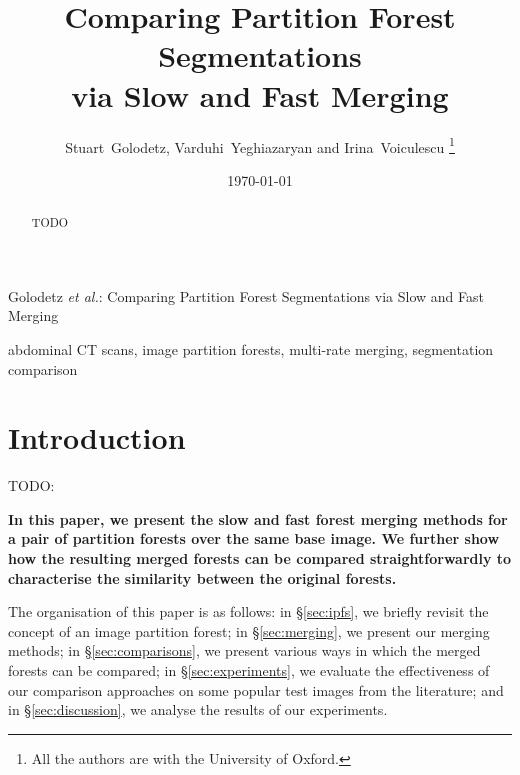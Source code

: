 \documentclass[10pt,twocolumn,twoside]{IEEEtran}
\begin{document}
\title{Comparing Partition Forest Segmentations \\ via Slow and Fast Merging}

\author{Stuart~Golodetz, Varduhi~Yeghiazaryan and Irina~Voiculescu%
\thanks{All the authors are with the University of Oxford.}}

\date{\today}

%
{Golodetz \MakeLowercase{\textit{et al.}}: Comparing Partition Forest Segmentations via Slow and Fast Merging}


\maketitle

\begin{abstract}
\noindent TODO
\end{abstract}

\begin{IEEEkeywords}
abdominal CT scans, image partition forests, multi-rate merging, segmentation comparison
\end{IEEEkeywords}

\IEEEpeerreviewmaketitle

\section{Introduction}

TODO: \cite{golodetz11}

\textbf{In this paper, we present the slow and fast forest merging methods for a pair of partition forests over the same base image. We further show how the resulting merged forests can be compared straightforwardly to characterise the similarity between the original forests.}

The organisation of this paper is as follows: in \S\ref{sec:ipfs}, we briefly revisit the concept of an image partition forest; in \S\ref{sec:merging}, we present our merging methods; in \S\ref{sec:comparisons}, we present various ways in which the merged forests can be compared; in \S\ref{sec:experiments}, we evaluate the effectiveness of our comparison approaches on some popular test images from the literature; and in \S\ref{sec:discussion}, we analyse the results of our experiments.

\end{document}
